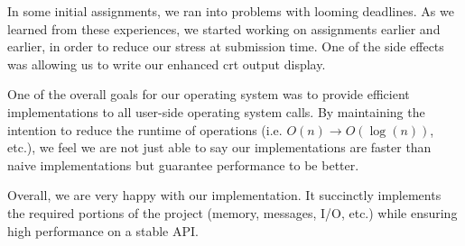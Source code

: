 \documentclass[12pt]{report}
\begin{document}
    In some initial assignments, we ran into problems with looming deadlines. As
    we learned from these experiences, we started working on assignments earlier
    and earlier, in order to reduce our stress at submission time. One of the
    side effects was allowing us to write our enhanced crt output display.

    One of the overall goals for our operating system was to provide efficient
    implementations to all user-side operating system calls. By maintaining the
    intention to reduce the runtime of operations (i.e. $O(n) \to O(\log(n))$,
    etc.), we feel we are not just able to say our implementations are faster
    than naive implementations but guarantee performance to be better.

    Overall, we are very happy with our implementation. It succinctly implements
    the required portions of the project (memory, messages, I/O, etc.) while
    ensuring high performance on a stable API.
\end{document}
